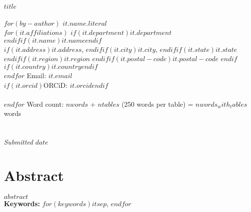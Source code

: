 \thispagestyle{empty}\noindent\textbf{$title$}\\%
\\%
$for(by-author)$
    \textbf{$it.name.literal$}\\%
    $for(it.affiliations)$
        $if(it.department)$$it.department$\\%
        $endif$$if(it.name)$$it.name$$endif$\\%
        $if(it.address)$$it.address$, $endif$$if(it.city)$$it.city$, $endif$$if(it.state)$$it.state$ $endif$$if(it.region)$$it.region$ $endif$$if(it.postal-code)$$it.postal-code$ $endif$$if(it.country)$$it.country$$endif$\\%
    $endfor$
    Email: \href{mailto:$it.email$}{$it.email$}\\%
    $if(it.orcid)$ORCiD: \href{https://orcid.org/$it.orcid$}{$it.orcid$}$endif$\\%
    \\%
$endfor$
Word count: $nwords$ + $ntables$ (250 words per table) = $nwords_with_tables$ words\\%
\\%
\\%
\textit{Submitted $date$}
\fancyhead[R]{}
\newpage

\section*{Abstract}

$abstract$\\%
\textbf{Keywords:} $for(keywords)$$it$$sep$, $endfor$

\newpage